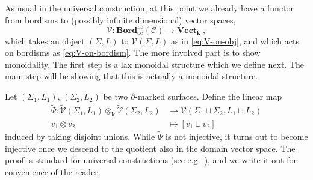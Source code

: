 \documentclass[11pt]{amsart}
\theoremstyle{definition}
\numberwithin{equation}{section}
\def\bd{{\partial}}
\def\ourBord{\mathbf{Bord}^{\operatorname{nc}}_{\operatorname{oc}}}
\def\ourV{\cV}
\def\tbv{\widetilde{\ourV}}
\def\cC{\mathcal{C}}
\def\cV{\mathcal{V}}
\def\kk{{\bm{k}}}
\def\to{\rightarrow}
\def\Vect{{\mathbf{Vect}}}
\newcommand{\ot}{\otimes}
\begin{document}
As usual in the universal construction, at this point we already have a functor from bordisms to (possibly infinite dimensional) vector spaces,
\begin{equation}\label{eq:V-is-functor}
    \ourV: \ourBord(\cC) \to \Vect_{\kk} \ ,
\end{equation}
which takes an object $(\Sigma,L)$ to $\ourV(\Sigma,L)$ as in \eqref{eq:V-on-obj}, and which acts on bordisms as \eqref{eq:V-on-bordism}. The more involved part is to show monoidality. The first step is a lax monoidal structure which we define next. The main step will be showing that this is actually a monoidal structure.

\medskip

Let $(\Sigma_1, L_1)$, $(\Sigma_2, L_2)$ be two $\bd$-marked surfaces. Define the linear map 
\begin{equation}
    \begin{split} 
\tilde\Psi : \tbv(\Sigma_1, L_1) \otimes_{\kk} \tbv(\Sigma_2, L_2) &\to \ourV(\Sigma_1 \sqcup \Sigma_2, L_1 \sqcup L_2)\\ 
v_1 \ot v_2 &\mapsto [v_1 \sqcup v_2]
\end{split}
\end{equation}
induced by taking disjoint unions. While $\tilde\Psi$ is not injective, it turns out to become injective once we descend to the quotient also in the domain vector space. The proof is standard for universal constructions (see e.g.\ \cite[Sec.\,7.7]{Geer-Patureau-book}), and we write it out for convenience of the reader.
\end{document}
